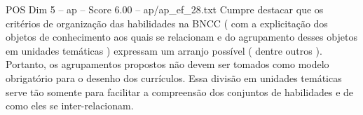 \begin{textsample}{POS Dim 5 – ap – Score 6.00 – ap/ap\_ef\_28.txt}
Cumpre destacar que os critérios de organização das habilidades na BNCC ( com a explicitação dos objetos de conhecimento aos quais se relacionam e do agrupamento desses objetos em unidades temáticas ) expressam um arranjo possível ( dentre outros ).
Portanto, os agrupamentos propostos não devem ser tomados como modelo obrigatório para o desenho dos currículos.
Essa divisão em unidades temáticas serve tão somente para facilitar a compreensão dos conjuntos de habilidades e de como eles se inter-relacionam.

\end{textsample}
